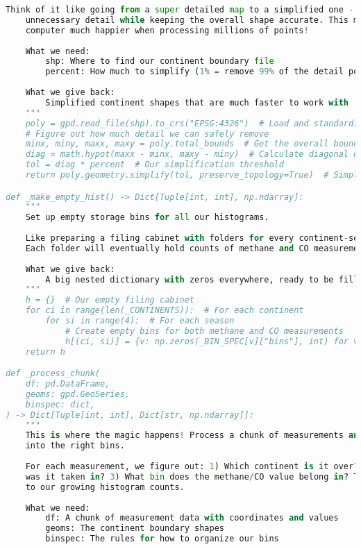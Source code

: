 \begin{lstlisting}[language=Python, caption=Histogram Generation Algorithm, label=alg:step03_histos, breaklines=true]
    Think of it like going from a super detailed map to a simplified one - we remove
    unnecessary detail while keeping the overall shape accurate. This makes our
    computer much happier when processing millions of points!
    
    What we need:
        shp: Where to find our continent boundary file
        percent: How much to simplify (1% = remove 99% of the detail points)
        
    What we give back:
        Simplified continent shapes that are much faster to work with
    """
    poly = gpd.read_file(shp).to_crs("EPSG:4326")  # Load and standardize coordinate system
    # Figure out how much detail we can safely remove
    minx, miny, maxx, maxy = poly.total_bounds  # Get the overall boundary
    diag = math.hypot(maxx - minx, maxy - miny)  # Calculate diagonal distance
    tol = diag * percent  # Our simplification threshold
    return poly.geometry.simplify(tol, preserve_topology=True)  # Simplify while keeping shape integrity

def _make_empty_hist() -> Dict[Tuple[int, int], np.ndarray]:
    """
    Set up empty storage bins for all our histograms.
    
    Like preparing a filing cabinet with folders for every continent-season combo.
    Each folder will eventually hold counts of methane and CO measurements.
    
    What we give back:
        A big nested dictionary with zeros everywhere, ready to be filled with data
    """
    h = {}  # Our empty filing cabinet
    for ci in range(len(_CONTINENTS)):  # For each continent
        for si in range(4):  # For each season
            # Create empty bins for both methane and CO measurements
            h[(ci, si)] = {v: np.zeros(_BIN_SPEC[v]["bins"], int) for v in _VARS}
    return h

def _process_chunk(
    df: pd.DataFrame,
    geoms: gpd.GeoSeries,
    binspec: dict,
) -> Dict[Tuple[int, int], Dict[str, np.ndarray]]:
    """
    This is where the magic happens! Process a chunk of measurements and sort them
    into the right bins.
    
    For each measurement, we figure out: 1) Which continent is it over? 2) What season
    was it taken in? 3) What bin does the methane/CO value belong in? Then we add it
    to our growing histogram counts.
    
    What we need:
        df: A chunk of measurement data with coordinates and values
        geoms: The continent boundary shapes
        binspec: The rules for how to organize our bins
        

\end{lstlisting}
